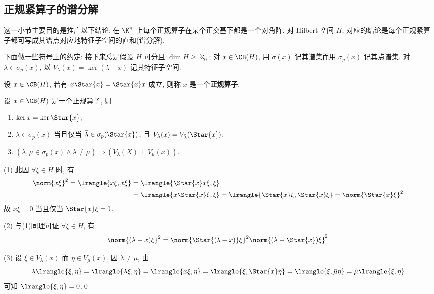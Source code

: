 	\subsection{正规紧算子的谱分解}

	这一小节主要目的是推广以下结论: 在 $ \K^n $ 上每个正规算子在某个正交基下都是一个对角阵. 对 Hilbert 空间 $ H $, 对应的结论是每个正规紧算子都可写成其谱点对应地特征子空间的直和(谱分解).

	下面做一些符号上的约定: 接下来总是假设 $ H $ 可分且 $ \dim H\geqslant \aleph_0 $; 对 $ x\in\CB(H) $, 用 $ \sigma(x) $ 记其谱集而用 $ \sigma_p(x) $ 记其点谱集. 对 $ \lambda\in\sigma_p(x) $, 以 $ V_\lambda(x)=\ker(\lambda-x) $ 记其特征子空间.
	
	\begin{Definition}[正规算子]
        设 $ x\in\CB(H) $, 若有 $ x\Star{x}=\Star{x}x $ 成立, 则称 $ x $ 是一个\textbf{正规算子}.
	\end{Definition}
	
	\begin{Proposition}
        设 $ x\in\CB(H) $ 是一个正规算子, 则
        \begin{enumerate}[(1)]
            \item $ \ker x=\ker \Star{x} $;
            \item $ \lambda\in\sigma_p(x) $ 当且仅当 $ \bar{\lambda}\in\sigma_p(\Star{x}) $, 且 $ V_{\lambda}(x)=V_{\bar{\lambda}}(\Star{x}) $;
            \item $ (\lambda,\mu\in\sigma_p(x)\land\lambda\ne\mu)\Longrightarrow(V_\lambda(X)\perp V_\mu(x)) $.
        \end{enumerate}
    \end{Proposition}
    \begin{Proof}
        (1) 此因 $ \forall\xi\in H $ 时, 有
        \[
            \begin{aligned}
                \norm{x\xi}^2=\lrangle{x\xi,x\xi}&=\lrangle{\Star{x}x\xi,\xi}\\
                &=\lrangle{x\Star{x}\xi,\xi}=\lrangle{\Star{x}\xi,\Star{x}\xi}=\norm{\Star{x}\xi}^2
            \end{aligned}
        \]
        故 $ x\xi=0 $ 当且仅当 $ \Star{x}\xi=0 $.

        (2) 与(1)同理可证 $ \forall\xi\in H $, 有
        \[
            \norm{(\lambda-x)\xi}^2=\norm{\Star{(\lambda-x)}\xi}^2\norm{(\bar{\lambda}-\Star{x})\xi}^2
        \]

        (3) 设 $ \xi\in V_\lambda(x) $ 而 $ \eta\in V_\mu(x) $, 因 $ \lambda\ne\mu $, 由
        \[
            \lambda\lrangle{\xi,\eta}=\lrangle{\lambda\xi,\eta}=\lrangle{x\xi,\eta}=\lrangle{\xi,\Star{x}\eta}=\lrangle{\xi,\bar{\mu}\eta}=\mu\lrangle{\xi,\eta}
        \]
        可知 $ \lrangle{\xi,\eta}=0 $.\qed
	\end{Proof}
	
